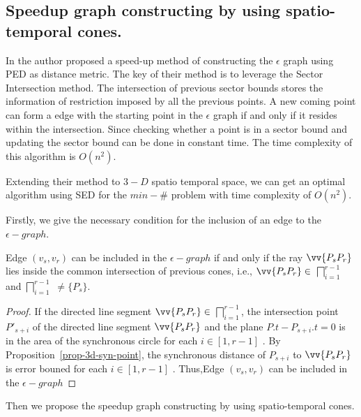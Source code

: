 \subsection{Speedup graph constructing by using spatio-temporal cones.}
In \cite{Chan:Optimal} the author proposed a speed-up method of constructing the
$\epsilon$ graph using PED as distance metric.
The key of their method is to leverage the Sector Intersection method.
The intersection of previous sector bounds stores the information of restriction
imposed by all the previous points. 
A new coming point can form a edge with the starting point in the $\epsilon$
graph if and only if it resides within the intersection.
Since checking whether a point is in a sector bound and updating the sector bound can be done in
constant time. The time complexity of this algorithm is $O(n^2)$.

Extending their method to $3-D$ spatio temporal space, we can get an optimal
algorithm using SED for the $min-\#$ problem with time complexity of $O(n^2)$.


Firstly, we give the necessary condition for the inclusion of an edge to the $\epsilon - graph$.

\begin{prop}
\label{prop-edge-check}
Edge $(v_s,v_r)$ can be included in the $\epsilon - graph$ if and only if the ray
$\vv{P_sP_r}$ lies inside the common intersection of previous cones, i.e.,
$\vv{P_sP_r} \in $ $\bigsqcap_{i=1}^{r - 1}$  and
$\bigsqcap_{i=1}^{r - 1}$ $\ne \{P_s\}$. 
\end{prop}

\begin{proof}
If the directed line segment $\vv{P_sP_r} \in$ $\bigsqcap_{i=1}^{r-1}$, the
intersection point $P'_{s+i}$ of the directed line segment $\vv{P_sP_r}$ and the
plane $P.t - P_{s+i}.t = 0$  is  in the area of the  synchronous circle
 for each $i \in [1,r - 1]$ . By Proposition~\ref{prop-3d-syn-point}, the
synchronous distance of $P_{s+i}$ to $\vv{P_sP_r}$ is error bouned for each $i \in [1,r - 1]$ . Thus,Edge
$(v_s,v_r)$ can be included in the $\epsilon - graph$  
\end{proof}


Then we propose the speedup graph constructing by using spatio-temporal cones.

